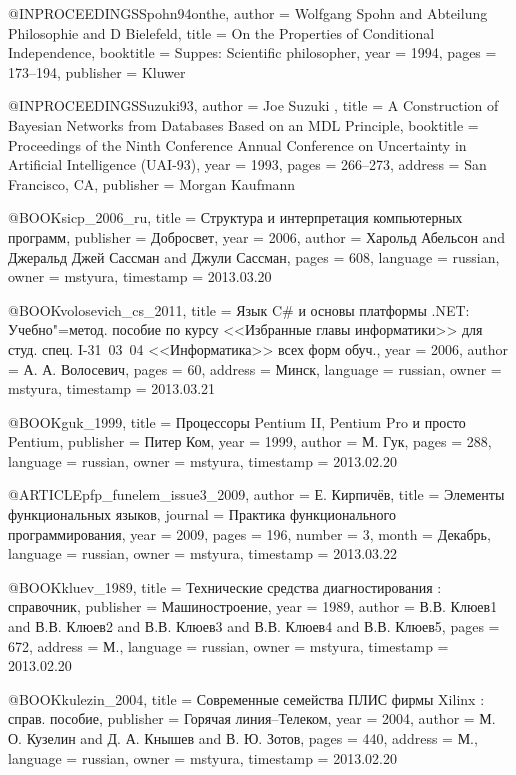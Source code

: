 @INPROCEEDINGS{Spohn94onthe,
  author = {Wolfgang Spohn and Abteilung Philosophie and D Bielefeld},
  title = {On the Properties of Conditional Independence},
  booktitle = {Suppes: Scientific philosopher},
  year = {1994},
  pages = {173--194},
  publisher = {Kluwer}
}

@INPROCEEDINGS{Suzuki93,
  author = {Joe Suzuki },
  title = {A Construction of Bayesian Networks from Databases Based on an MDL
	Principle},
  booktitle = {Proceedings of the Ninth Conference Annual Conference on Uncertainty
	in Artificial Intelligence (UAI-93)},
  year = {1993},
  pages = {266--273},
  address = {San Francisco, CA},
  publisher = {Morgan Kaufmann}
}

@BOOK{sicp_2006_ru,
  title = {Структура и интерпретация компьютерных программ},
  publisher = {Добросвет},
  year = {2006},
  author = {Харольд Абельсон and Джеральд Джей Сассман and Джули Сассман},
  pages = {608},
  language = {russian},
  owner = {mstyura},
  timestamp = {2013.03.20}
}

@BOOK{volosevich_cs_2011,
  title = {Язык C\# и основы платформы .NET: Учебно"=метод. пособие по курсу
	<<Избранные главы информатики>> для студ. спец. \mbox{I-31~03~04}
	<<Информатика>> всех форм обуч.},
  year = {2006},
  author = {А. А. Волосевич},
  pages = {60},
  address = {Минск},
  language = {russian},
  owner = {mstyura},
  timestamp = {2013.03.21}
}

@BOOK{guk_1999,
  title = {Процессоры Pentium II, Pentium Pro и просто Pentium},
  publisher = {Питер Ком},
  year = {1999},
  author = {М. Гук},
  pages = {288},
  language = {russian},
  owner = {mstyura},
  timestamp = {2013.02.20}
}

@ARTICLE{pfp_funelem_issue3_2009,
  author = {Е. Кирпичёв},
  title = {Элементы функциональных языков},
  journal = {Практика функционального программирования},
  year = {2009},
  pages = {196},
  number = {3},
  month = {Декабрь},
  language = {russian},
  owner = {mstyura},
  timestamp = {2013.03.22}
}

@BOOK{kluev_1989,
  title = {Технические средства диагностирования : справочник},
  publisher = {Машиностроение},
  year = {1989},
  author = {В.В. Клюев1 and В.В. Клюев2 and В.В. Клюев3 and В.В. Клюев4 and В.В.
	Клюев5},
  pages = {672},
  address = {М.},
  language = {russian},
  owner = {mstyura},
  timestamp = {2013.02.20}
}

@BOOK{kulezin_2004,
  title = {Современные семейства ПЛИС фирмы Xilinx : справ. пособие},
  publisher = {Горячая линия–Телеком},
  year = {2004},
  author = {М. О. Кузелин and Д. А. Кнышев and В. Ю. Зотов},
  pages = {440},
  address = {М.},
  language = {russian},
  owner = {mstyura},
  timestamp = {2013.02.20}
}

